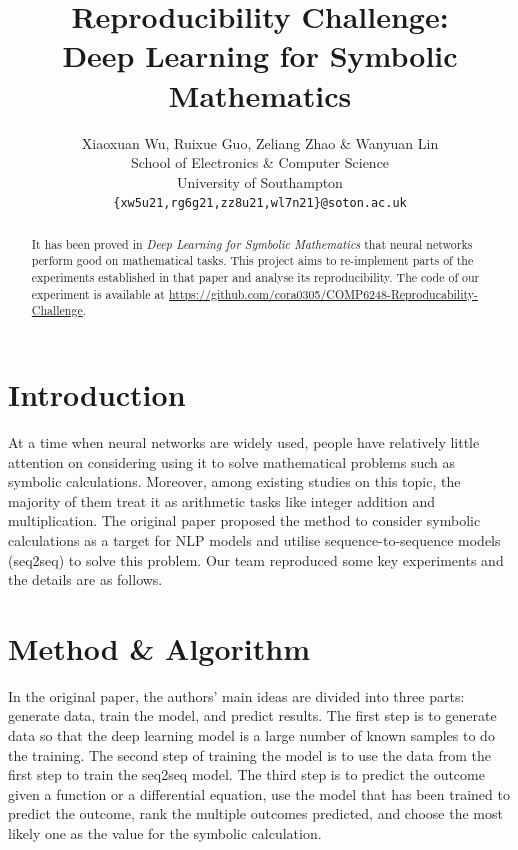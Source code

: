 \documentclass{article} %
\title{Reproducibility Challenge: \\ Deep Learning for Symbolic Mathematics}
\author{Xiaoxuan Wu, Ruixue Guo, Zeliang Zhao \& Wanyuan Lin\\
School of Electronics \& Computer Science\\
University of Southampton\\
\texttt{\{xw5u21,rg6g21,zz8u21,wl7n21\}@soton.ac.uk}
}
\begin{document}
\maketitle

\begin{abstract}
It has been proved in \textit {Deep Learning for Symbolic Mathematics} \citet{Lample} that neural networks perform good on mathematical tasks. This project aims to re-implement parts of the experiments established in that paper and analyse its reproducibility. The code of our experiment is available at \url{https://github.com/cora0305/COMP6248-Reproducability-Challenge}.
\end{abstract}

\section{Introduction}
At a time when neural networks are widely used, people have relatively little attention on considering using it to solve mathematical problems such as symbolic calculations. Moreover, among existing studies on this topic, the majority of  them treat it as arithmetic tasks like integer addition and multiplication\cite{zaremba2014learning, arabshahi2018towards}. The original paper proposed the method to consider symbolic calculations as a target for NLP models and utilise sequence-to-sequence models (seq2seq) to solve this problem. Our team reproduced some key experiments and the details are as follows.


\section{Method \& Algorithm}
\label{MnA}
In the original paper, the authors’ main ideas are divided into three parts: generate data, train the model, and predict results. The first step is to generate data so that the deep learning model is a large number of known samples to do the training. The second step of training the model is to use the data from the first step to train the seq2seq model. The third step is to predict the outcome given a function or a differential equation, use the model that has been trained to predict the outcome, rank the multiple outcomes predicted, and choose the most likely one as the value for the symbolic calculation.
\end{document}
